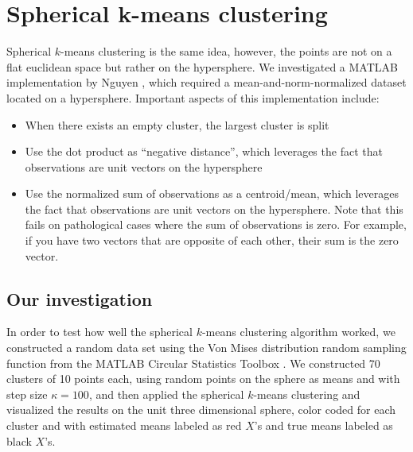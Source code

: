 \documentclass[../tech_report_1.tex]{subfiles}
\begin{document}
\section{Spherical k-means clustering}

Spherical $k$-means clustering is the same idea, however, the points are not on a flat euclidean space but rather on the hypersphere.
We investigated a MATLAB implementation by Nguyen  \cite{nguyen2008gene,nguyen_spherical_clustering},
which required a mean-and-norm-normalized dataset located on a hypersphere.
Important aspects of this implementation include:
\begin{itemize}
\item When there exists an empty cluster, the largest cluster is split
\item Use the dot product as ``negative distance'', which leverages the
fact that observations are unit vectors on the hypersphere
\item Use the normalized sum of observations as a centroid/mean, which leverages
the fact that observations are unit vectors on the hypersphere. Note
that this fails on pathological cases where the sum of observations
is zero.
For example, if you have two vectors that are opposite of each other, their sum is the zero vector.
\end{itemize}

\subsection{Our investigation}

In order to test how well the spherical $k$-means clustering algorithm
worked, we constructed a random data set using the Von Mises distribution
random sampling function from the MATLAB Circular Statistics Toolbox  \cite{circstats}.
We constructed 70 clusters of 10 points each, using random points
on the sphere as means and with step size $\kappa=100$, and then applied the spherical $k$-means clustering and visualized the results on the unit
three dimensional sphere, color coded for each cluster and with estimated
means labeled as red $X$'s and true means labeled as black $X$'s.


\end{document}
